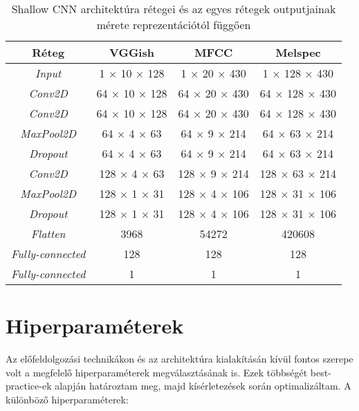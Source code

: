 \begin{table}[H]
	\centering
	\begin{tabular}{ | c | c | c | c |}
		\hline
		\textbf{Réteg} & \textbf{VGGish} & \textbf{MFCC} & \textbf{Melspec}  \\
		\hline \hline
		\emph{Input} & 1 $\times$ 10 $\times$ 128 & 1 $\times$ 20 $\times$ 430 & 1 $\times$ 128 $\times$ 430 \\
		\hline
		\emph{Conv2D} & 64 $\times$ 10 $\times$ 128 & 64 $\times$ 20 $\times$ 430 & 64 $\times$ 128 $\times$ 430 \\
		\hline
		\emph{Conv2D} & 64 $\times$ 10 $\times$ 128 & 64 $\times$ 20 $\times$ 430 & 64 $\times$ 128 $\times$ 430 \\
		\hline
		\emph{MaxPool2D} & 64 $\times$ 4 $\times$ 63 & 64 $\times$ 9 $\times$ 214 & 64 $\times$ 63 $\times$ 214 \\
		\hline
		\emph{Dropout} & 64 $\times$ 4 $\times$ 63 & 64 $\times$ 9 $\times$ 214 & 64 $\times$ 63 $\times$ 214 \\
		\hline 
		\emph{Conv2D} & 128 $\times$ 4 $\times$ 63 & 128 $\times$ 9 $\times$ 214 & 128 $\times$ 63 $\times$ 214 \\
		\hline
		\emph{MaxPool2D} & 128 $\times$ 1 $\times$ 31 & 128 $\times$ 4 $\times$ 106 & 128 $\times$ 31 $\times$ 106 \\
		\hline
		\emph{Dropout} & 128 $\times$ 1 $\times$ 31 & 128 $\times$ 4 $\times$ 106 & 128 $\times$ 31 $\times$ 106 \\
		\hline
		\emph{Flatten} & 3968 & 54272 & 420608 \\
		\hline
		\emph{Fully-connected} & 128 & 128 & 128 \\
		\hline
		\emph{Fully-connected} & 1 & 1  & 1 \\
		\hline
	\end{tabular}
	\caption{Shallow CNN architektúra rétegei és az egyes rétegek outputjainak mérete reprezentációtól függően}
	\label{tab:scnn}
\end{table}

\section{Hiperparaméterek}

Az előfeldolgozási technikákon és az architektúra kialakításán kívül fontos szerepe volt a megfelelő hiperparaméterek megválasztásának is. Ezek többségét best-practice-ek alapján határoztam meg, majd kísérletezések során optimalizáltam. A különböző hiperparaméterek:

